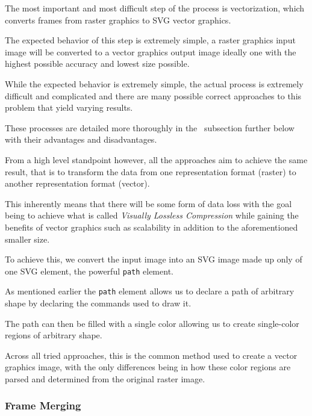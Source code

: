 \documentclass[12pt]{article}
\newcommand{\sentence}{} %
\newcommand{\italic}[1]{\textit{#1}}
\begin{document}
    \tab
    The most important and most difficult step of the process is vectorization, which converts
    frames from raster graphics to SVG vector graphics.
    \sentence
    The expected behavior of this step is extremely simple, a raster graphics input image will be converted to a
    vector graphics output image ideally one with the highest possible accuracy and lowest size possible.
    \sentence
    While the expected behavior is extremely simple, the actual process is extremely difficult and complicated and
    there are many possible correct approaches to this problem that yield varying results.
    \sentence
    These processes are detailed more thoroughly in the~ subsection further below
    with their advantages and disadvantages.
    \sentence
    From a high level standpoint however, all the approaches aim to achieve the same result, that is to transform the
    data from one representation format (raster) to another representation format (vector).
    \sentence
    This inherently means that there will be some form of data loss with the goal being to achieve what is called
    \italic{Visually Lossless Compression} while gaining the benefits of vector graphics such as scalability in
    addition to the aforementioned smaller size.
    \sentence
    To achieve this, we convert the input image into an SVG image made up only of one SVG element, the powerful
    \verb|path| element.
    \sentence
    As mentioned earlier the \verb|path| element allows us to declare a path of arbitrary shape by declaring the
    commands used to draw it.
    \sentence
    The path can then be filled with a single color allowing us to create single-color regions of arbitrary shape.
    \sentence
    Across all tried approaches, this is the common method used to create a vector graphics image, with the only
    differences being in how these color regions are parsed and determined from the original raster image.


    \subsubsection{Frame Merging}\label{subsubsec:frame-merging}
\end{document}
